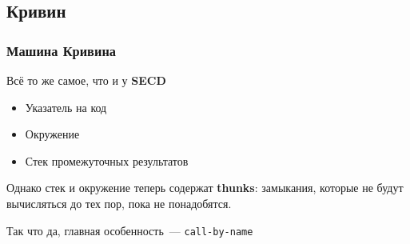 \subsection{Кривин}
\begin{frame}
  \frametitle{Машина Кривина}
  Всё то же самое, что и у \textbf{SECD}
  \begin{itemize}
    \item Указатель на код
    \item Окружение
    \item Стек промежуточных результатов
  \end{itemize}
  Однако стек и окружение теперь содержат \textbf{thunks}: замыкания, которые не будут вычисляться до тех пор, пока не понадобятся.

  Так что да, главная особенность~--- \texttt{call-by-name}
\end{frame}

